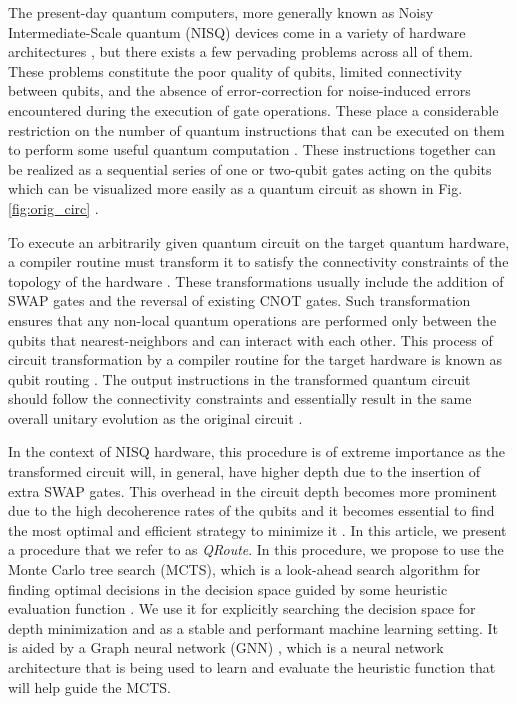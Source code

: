\documentclass[%
 reprint,
 longbibliography,
 amsmath,amssymb,
 aps,
]{revtex4-2}
\begin{document}
The present-day quantum computers, more generally known as Noisy Intermediate-Scale quantum (NISQ) devices \citep{nisq_preskill} come in a variety of hardware architectures \cite{IBMQ, hardware_sycamore, RigettiAspen, Xanadu}, but there exists a few pervading problems across all of them. These problems constitute the poor quality of qubits, limited connectivity between qubits, and the absence of error-correction for noise-induced errors encountered during the execution of gate operations. These place a considerable restriction on the number of quantum instructions that can be executed on them to perform some useful quantum computation \cite{nisq_preskill}. These instructions together can be realized as a sequential series of one or two-qubit gates acting on the qubits which can be visualized more easily as a quantum circuit as shown in Fig. \ref{fig:orig_circ} \citep{others_childs}.

To execute an arbitrarily given quantum circuit on the target quantum hardware, a compiler routine must transform it to satisfy the connectivity constraints of the topology of the hardware \citep{qroute_tket}. These transformations usually include the addition of SWAP gates and the reversal of existing CNOT gates. Such transformation ensures that any non-local quantum operations are performed only between the qubits that nearest-neighbors and can interact with each other. This process of circuit transformation by a compiler routine for the target hardware is known as qubit routing \citep{qroute_tket}. The output instructions in the transformed quantum circuit should follow the connectivity constraints and essentially result in the same overall unitary evolution as the original circuit \citep{qroute_dqn2}.

In the context of NISQ hardware, this procedure is of extreme importance as the transformed circuit will, in general, have higher depth due to the insertion of extra SWAP gates. This overhead in the circuit depth becomes more prominent due to the high decoherence rates of the qubits and it becomes essential to find the most optimal and efficient strategy to minimize it \citep{qroute_tket, qroute_dqn1, qroute_dqn2}. In this article, we present a procedure that we refer to as \textit{QRoute}. In this procedure, we propose to use the Monte Carlo tree search (MCTS), which is a look-ahead search algorithm for finding optimal decisions in the decision space guided by some heuristic evaluation function \citep{mcts_bandit_1, mcts_bandit_2, mcts_uct}. We use it for explicitly searching the decision space for depth minimization and as a stable and performant machine learning setting. It is aided by a Graph neural network (GNN) \citep{nn_edge_conv}, which is a neural network architecture that is being used to learn and evaluate the heuristic function that will help guide the MCTS.
\end{document}
